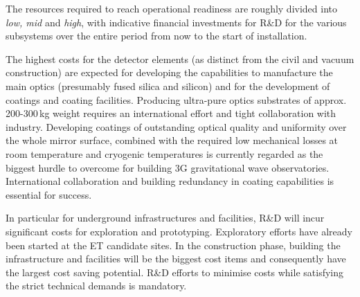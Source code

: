 The resources required to reach operational readiness are roughly divided into \textit{low, mid} and \textit{high}, with indicative financial investments for R\&D for the various subsystems over the entire period from now to the start of installation. 

The highest costs for the detector elements (as distinct from the civil and vacuum construction) are expected for developing the capabilities to manufacture the main optics (presumably fused silica and silicon) and for the development of coatings and coating facilities. 
Producing ultra-pure optics substrates of approx. 200-300\,kg weight requires an international effort and tight collaboration with industry. Developing coatings of outstanding optical quality and uniformity over the whole mirror surface, combined with the required low mechanical losses at  room temperature and cryogenic temperatures is currently regarded as the biggest hurdle to overcome for building 3G gravitational wave observatories. International collaboration and building redundancy in coating capabilities is essential for success.

In particular for underground infrastructures and facilities, R\&D will incur significant costs for exploration and prototyping. Exploratory efforts have already been started at the ET candidate sites. In the construction phase, building the infrastructure and facilities will be the biggest cost items and consequently have the largest cost saving potential. R\&D efforts to minimise costs while satisfying the strict technical demands is mandatory.





